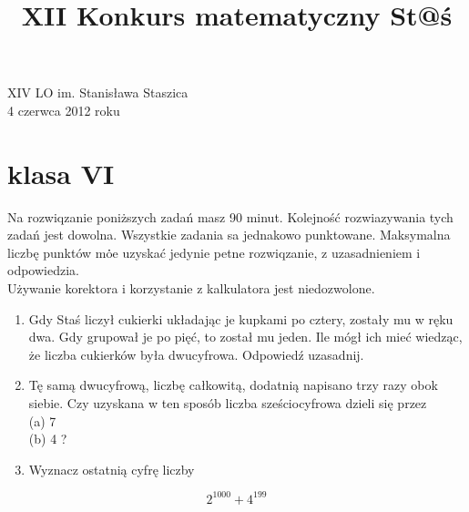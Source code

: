 \documentclass[10pt]{article}
\title{XII Konkurs matematyczny St@ś }
\author{}
\date{}
\begin{document}
\maketitle
XIV LO im. Stanisława Staszica\\
4 czerwca 2012 roku

\section*{klasa VI}
Na rozwiqzanie poniższych zadań masz 90 minut. Kolejność rozwiazywania tych zadań jest dowolna. Wszystkie zadania sa jednakowo punktowane. Maksymalna liczbę punktów mȯ̇e uzyskać jedynie petne rozwiqzanie, z uzasadnieniem i odpowiedzia.\\
Używanie korektora i korzystanie z kalkulatora jest niedozwolone.

\begin{enumerate}
  \item Gdy Staś liczył cukierki układając je kupkami po cztery, zostały mu w ręku dwa. Gdy grupował je po pięć, to został mu jeden. Ile mógł ich mieć wiedząc, że liczba cukierków była dwucyfrowa. Odpowiedź uzasadnij.
  \item Tę samą dwucyfrową, liczbę całkowitą, dodatnią napisano trzy razy obok siebie. Czy uzyskana w ten sposób liczba sześciocyfrowa dzieli się przez\\
(a) 7\\
(b) 4 ?
  \item Wyznacz ostatnią cyfrę liczby
\end{enumerate}

\[
2^{1000}+4^{199}
\]
\end{document}
